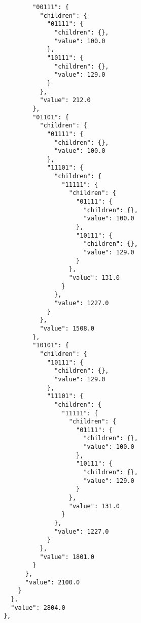 \documentclass{article}
\begin{document}
\begin{listing}
\begin{verbatim}
                    "00111": {
                      "children": {
                        "01111": {
                          "children": {},
                          "value": 100.0
                        },
                        "10111": {
                          "children": {},
                          "value": 129.0
                        }
                      },
                      "value": 212.0
                    },
                    "01101": {
                      "children": {
                        "01111": {
                          "children": {},
                          "value": 100.0
                        },
                        "11101": {
                          "children": {
                            "11111": {
                              "children": {
                                "01111": {
                                  "children": {},
                                  "value": 100.0
                                },
                                "10111": {
                                  "children": {},
                                  "value": 129.0
                                }
                              },
                              "value": 131.0
                            }
                          },
                          "value": 1227.0
                        }
                      },
                      "value": 1508.0
                    },
                    "10101": {
                      "children": {
                        "10111": {
                          "children": {},
                          "value": 129.0
                        },
                        "11101": {
                          "children": {
                            "11111": {
                              "children": {
                                "01111": {
                                  "children": {},
                                  "value": 100.0
                                },
                                "10111": {
                                  "children": {},
                                  "value": 129.0
                                }
                              },
                              "value": 131.0
                            }
                          },
                          "value": 1227.0
                        }
                      },
                      "value": 1801.0
                    }
                  },
                  "value": 2100.0
                }
              },
              "value": 2804.0
            },

\end{verbatim}
\end{listing}
\end{document}
